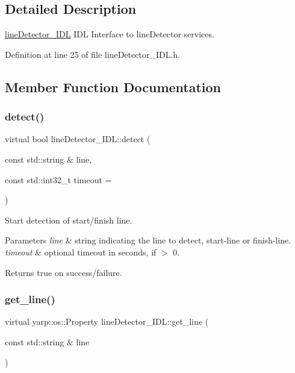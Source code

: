 \subsection{Detailed Description}
\mbox{\hyperlink{classlineDetector__IDL}{line\+Detector\+\_\+\+I\+DL}} I\+DL Interface to line\+Detector services. 

Definition at line 25 of file line\+Detector\+\_\+\+I\+D\+L.\+h.



\subsection{Member Function Documentation}
\mbox{\label{classlineDetector__IDL_a393124f2e4ea02a0ef2d4ba4df5d73c0}} 
\subsubsection{\texorpdfstring{detect()}{detect()}}
{\footnotesize\ttfamily virtual bool line\+Detector\+\_\+\+I\+D\+L\+::detect (\begin{DoxyParamCaption}\item[{const std\+::string \&}]{line,  }\item[{const std\+::int32\+\_\+t}]{timeout = {} }\end{DoxyParamCaption})\hspace{0.3cm}{\ttfamily [virtual]}}



Start detection of start/finish line. 


\begin{DoxyParams}{Parameters}
{\em line} & string indicating the line to detect, start-\/line or finish-\/line. \\
\hline
{\em timeout} & optional timeout in seconds, if $>$ 0. \\
\hline
\end{DoxyParams}
\begin{DoxyReturn}{Returns}
true on success/failure. 
\end{DoxyReturn}
\mbox{\label{classlineDetector__IDL_ae617a7505a800d086c201e047f32918b}} 
\subsubsection{\texorpdfstring{get\_line()}{get\_line()}}
{\footnotesize\ttfamily virtual yarp\+::os\+::\+Property line\+Detector\+\_\+\+I\+D\+L\+::get\+\_\+line (\begin{DoxyParamCaption}\item[{const std\+::string \&}]{line }\end{DoxyParamCaption})\hspace{0.3cm}{\ttfamily [virtual]}}




